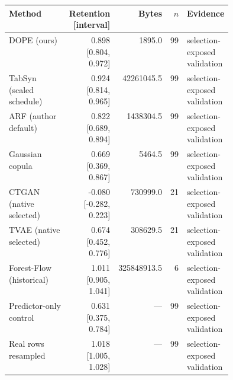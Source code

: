 \begingroup\small
\begin{tabular}{@{}p{0.27\linewidth}rrrp{0.17\linewidth}@{}}
\toprule Method & Retention [interval] & Bytes & $n$ & Evidence \\
\midrule
DOPE (ours) & 0.898 [0.804, 0.972] & 1895.0 & 99 & selection-exposed validation \\
TabSyn (scaled schedule) & 0.924 [0.814, 0.965] & 42261045.5 & 99 & selection-exposed validation \\
ARF (author default) & 0.822 [0.689, 0.894] & 1438304.5 & 99 & selection-exposed validation \\
Gaussian copula & 0.669 [0.369, 0.867] & 5464.5 & 99 & selection-exposed validation \\
CTGAN (native selected) & -0.080 [-0.282, 0.223] & 730999.0 & 21 & selection-exposed validation \\
TVAE (native selected) & 0.674 [0.452, 0.776] & 308629.5 & 21 & selection-exposed validation \\
Forest-Flow (historical) & 1.011 [0.905, 1.041] & 325848913.5 & 6 & selection-exposed validation \\
Predictor-only control & 0.631 [0.375, 0.784] & --- & 99 & selection-exposed validation \\
Real rows resampled & 1.018 [1.005, 1.028] & --- & 99 & selection-exposed validation \\
\bottomrule
\end{tabular}
\endgroup
